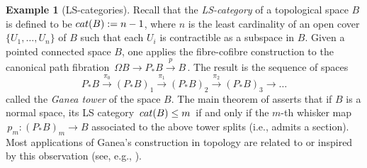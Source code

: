\documentclass[11pt]{amsart}
\theoremstyle{definition}
\newtheorem{example}[theorem]{Example}
\theoremstyle{remark}
\numberwithin{equation}{section}
\newcommand{\la}{\label}
\begin{document}
\begin{example}[LS-categories] 
\la{exga}
Recall that the {\it LS-category} of a topological space $ B $
is defined to be  $ {\rm cat}(B) := n-1 $, where $n$ is the least cardinality of an open cover $\{U_1,\ldots, U_n\}$ of $B$ such that each $U_i$ is contractible as a subspace in $B$.
Given a pointed connected space $B$, one applies the fibre-cofibre construction to the canonical path fibration $\, \Omega B \to P_*B  \xrightarrow{p} B \,$. The result is the sequence of spaces  
%
$$ 
P_*B  \xrightarrow{\pi_0} (P_*B)_1 \xrightarrow{\pi_1} (P_*B)_2 \xrightarrow{\pi_2} (P_*B)_3 \to \ldots 
$$
%
called the {\it Ganea tower}  of the space $B$. The main theorem of \cite{Ga67} asserts that if $B$ is a normal space, its LS category $\, {\rm cat}(B) \le m \,$ if and only if the $m$-th whisker map $\,p_m: (P_*B)_m \to  B $ associated to the above tower splits 
(i.e., admits a section). Most applications of Ganea's construction in topology are related to or inspired by this observation (see, e.g., \cite{CLOT03}).
\end{example}
%
\end{document}
